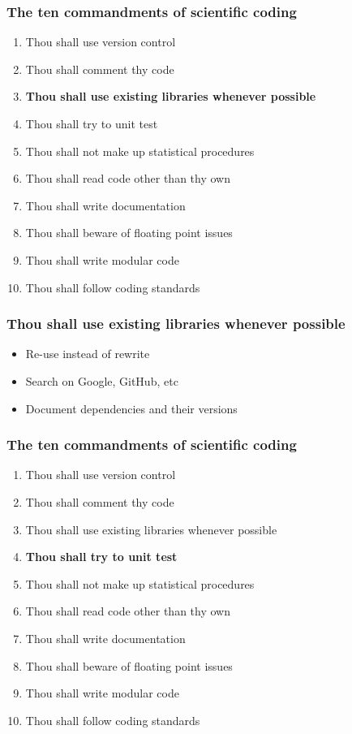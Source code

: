\documentclass[slidestop]{beamer}
\begin{document}
\begin{frame}
  \frametitle{The ten commandments of scientific coding}
  \begin{enumerate}
    \item Thou shall use version control
    \item Thou shall comment thy code
    \item {\bf Thou shall use existing libraries whenever possible}
    \item Thou shall try to unit test
    \item Thou shall not make up statistical procedures
    \item Thou shall read code other than thy own
    \item Thou shall write documentation
    \item Thou shall beware of floating point issues
    \item Thou shall write modular code
    \item Thou shall follow coding standards
  \end{enumerate}
\end{frame}

\begin{frame}
  \frametitle{Thou shall use existing libraries whenever possible}
  \begin{itemize}[<+->]
    \item Re-use instead of rewrite
    \item Search on Google, GitHub, etc
    \item Document dependencies and their versions
  \end{itemize}
\end{frame}

\begin{frame}
  \frametitle{The ten commandments of scientific coding}
  \begin{enumerate}
    \item Thou shall use version control
    \item Thou shall comment thy code
    \item Thou shall use existing libraries whenever possible
    \item {\bf Thou shall try to unit test}
    \item Thou shall not make up statistical procedures
    \item Thou shall read code other than thy own
    \item Thou shall write documentation
    \item Thou shall beware of floating point issues
    \item Thou shall write modular code
    \item Thou shall follow coding standards
  \end{enumerate}
\end{frame}
\end{document}
